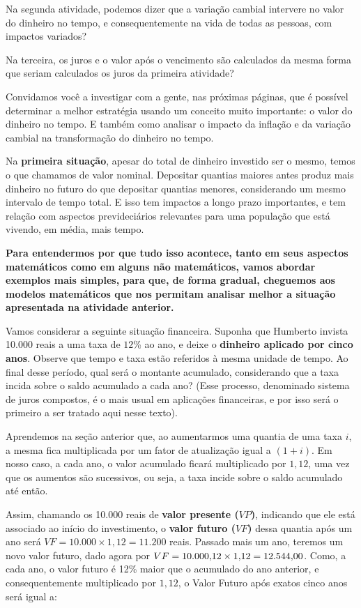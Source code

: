 Na segunda atividade, podemos dizer que a variação cambial intervere no valor do dinheiro no tempo, e consequentemente na vida de todas as pessoas, com impactos variados?

Na terceira, os juros e o valor após o vencimento são calculados da mesma forma que seriam calculados os juros da primeira atividade?

Convidamos você a investigar com a gente, nas próximas páginas, que é possível determinar a melhor estratégia usando um conceito muito importante: o valor do dinheiro no tempo. E também como analisar o impacto da inflação e da variação cambial na transformação do dinheiro no tempo.

Na \textbf{primeira situação}, apesar do total de dinheiro investido ser o mesmo, temos o que chamamos de valor nominal. Depositar quantias maiores antes produz mais dinheiro no futuro do que depositar quantias menores, considerando um mesmo intervalo de tempo total. E isso tem impactos a longo prazo importantes, e tem relação com aspectos prevideciários relevantes para uma população que está vivendo, em média, mais tempo.

\textbf{Para entendermos por que tudo isso acontece, tanto em seus aspectos matemáticos como em alguns não matemáticos, vamos abordar exemplos mais simples, para que, de forma gradual, cheguemos aos modelos matemáticos que nos permitam analisar melhor a situação apresentada na atividade anterior.}

Vamos considerar a seguinte situação financeira. Suponha que Humberto invista 10.000 reais a uma taxa de $12$\% ao ano, e deixe o \textbf{dinheiro aplicado por cinco anos}. Observe que tempo e taxa estão referidos à mesma unidade de tempo. Ao final desse período, qual será o montante acumulado, considerando que a taxa incida sobre o saldo acumulado a cada ano? (Esse processo, denominado sistema de juros compostos, é o mais usual em aplicações financeiras, e por isso será o primeiro a ser tratado aqui nesse texto).

Aprendemos na seção anterior que, ao aumentarmos uma quantia de uma taxa $i$, a mesma fica multiplicada por um fator de atualização igual a $(1+i)$. Em nosso caso, a cada ano, o valor acumulado ficará multiplicado por $1,12$, uma vez que os aumentos são sucessivos, ou seja, a taxa incide sobre o saldo acumulado até então.

Assim, chamando os 10.000 reais de \textbf{valor presente ($VP$)}, indicando que ele está associado ao início do investimento, o \textbf{valor futuro ($VF$)} dessa quantia após um ano será $VF = 10.000\times1{,}12 = 11.200$ reais. Passado mais um ano, teremos um novo valor futuro, dado agora por $VF = 10.000 \time 1{,}12 \times1{,}12 = 12.544{,}00$. Como, a cada ano, o valor futuro é 12\% maior que o acumulado do ano anterior, e consequentemente multiplicado por $1{,}12$, o Valor Futuro após exatos cinco anos será igual a:

